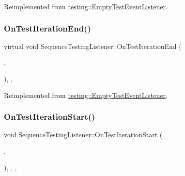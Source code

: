 Reimplemented from \mbox{\hyperlink{classtesting_1_1_empty_test_event_listener_aae9c5c61e476f0c421402fb1dde434d2}{testing\+::\+Empty\+Test\+Event\+Listener}}.

\mbox{\label{class_sequence_testing_listener_a783bc01e2a95f5bf73bbde4d96832e0f}} 
\subsubsection{\texorpdfstring{OnTestIterationEnd()}{OnTestIterationEnd()}\hspace{0.1cm}{\footnotesize\ttfamily [3/3]}}
{\footnotesize\ttfamily virtual void Sequence\+Testing\+Listener\+::\+On\+Test\+Iteration\+End (\begin{DoxyParamCaption}\item[{const \mbox{\hyperlink{classtesting_1_1_unit_test}{Unit\+Test}} \&}]{,  }\item[{int}]{ }\end{DoxyParamCaption})\hspace{0.3cm}{\ttfamily [inline]}, {\ttfamily [protected]}, {\ttfamily [virtual]}}



Reimplemented from \mbox{\hyperlink{classtesting_1_1_empty_test_event_listener_aae9c5c61e476f0c421402fb1dde434d2}{testing\+::\+Empty\+Test\+Event\+Listener}}.

\mbox{\label{class_sequence_testing_listener_a31ffb1bb77e88fff266511b1d8427e20}} 
\subsubsection{\texorpdfstring{OnTestIterationStart()}{OnTestIterationStart()}\hspace{0.1cm}{\footnotesize\ttfamily [1/3]}}
{\footnotesize\ttfamily void Sequence\+Testing\+Listener\+::\+On\+Test\+Iteration\+Start (\begin{DoxyParamCaption}\item[{const \mbox{\hyperlink{classtesting_1_1_unit_test}{Unit\+Test}} \&}]{,  }\item[{int}]{ }\end{DoxyParamCaption})\hspace{0.3cm}{\ttfamily [inline]}, {\ttfamily [override]}, {\ttfamily [protected]}, {\ttfamily [virtual]}}



